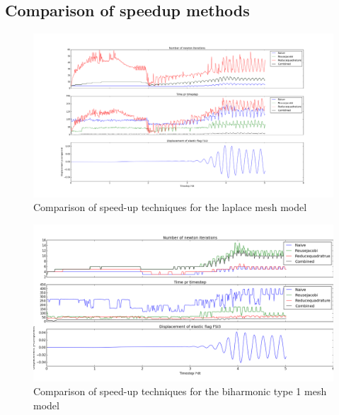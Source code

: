 \subsection{Comparison of speedup methods}

\begin{figure}[h!]
 \includegraphics[scale=0.36]{./Fig/itercompare.png}
 \caption{Comparison of speed-up techniques for the laplace mesh model}
\end{figure}

\begin{figure}[h!]
 \includegraphics[scale=0.4]{./Fig/bi_compareit.png}
 \caption{Comparison of speed-up techniques for the biharmonic type 1 mesh model}
\end{figure}



